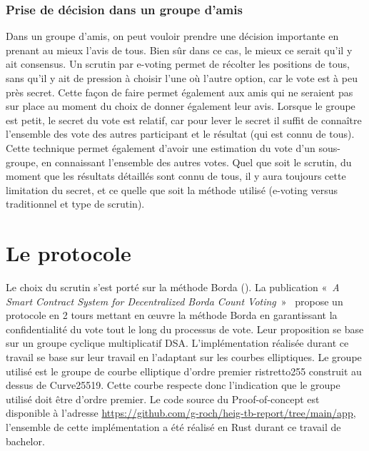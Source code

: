 \documentclass[../report]{subfiles}
\begin{document}
\subsection{Prise de décision dans un groupe d'amis}

Dans un groupe d'amis, on peut vouloir prendre une décision importante en prenant au mieux l'avis de tous. 
Bien sûr dans ce cas, le mieux ce serait qu'il y ait consensus.
Un scrutin par e-voting permet de récolter les positions de tous, sans qu'il y ait de pression à choisir l'une où 
l'autre option, car le vote est à peu près secret. 
Cette façon de faire permet également aux amis qui ne seraient pas sur place au moment du choix de donner également leur avis.
Lorsque le groupe est petit, le secret du vote est relatif, car pour lever le secret il suffit de connaître l'ensemble des
vote des autres participant et le résultat (qui est connu de tous).
Cette technique permet également d'avoir une estimation du vote d'un sous-groupe, en connaissant l'ensemble des autres votes.
Quel que soit le scrutin, du moment que les résultats détaillés sont connu de tous, il y aura toujours cette limitation du secret, et ce  
quelle que soit la méthode utilisé (e-voting versus traditionnel et type de scrutin).

%



\chapter{Le protocole}

Le choix du scrutin s'est porté sur la méthode Borda ().
La publication «~\emph{A Smart Contract System for Decentralized Borda Count Voting}~»~\cite{panja_smart_2020}
propose un protocole en 2 tours mettant en œuvre la méthode Borda en garantissant la
confidentialité du vote tout le long du processus de vote.
Leur proposition se base sur un groupe cyclique multiplicatif DSA. 
L'implémentation réalisée durant ce travail se base sur leur travail en l'adaptant sur les courbes elliptiques.
Le groupe utilisé est le groupe de courbe elliptique d'ordre premier ristretto255 construit au dessus de Curve25519.
Cette courbe respecte donc l'indication que le groupe utilisé doit être d'ordre premier.
Le code source du Proof-of-concept est disponible à l'adresse \url{https://github.com/g-roch/heig-tb-report/tree/main/app},
l'ensemble de cette implémentation a été réalisé en Rust durant ce travail de bachelor.
\end{document}
